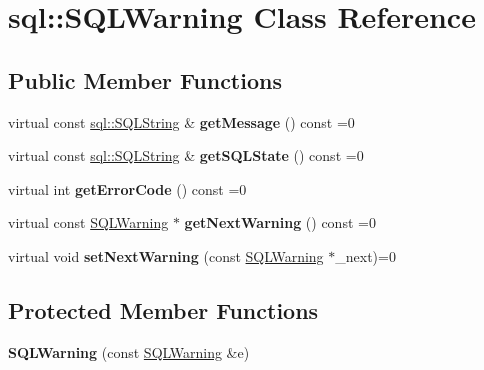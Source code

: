 \hypertarget{classsql_1_1_s_q_l_warning}{}\section{sql\+:\+:S\+Q\+L\+Warning Class Reference}
\label{classsql_1_1_s_q_l_warning}
\subsection*{Public Member Functions}
\begin{DoxyCompactItemize}
\item 
\hypertarget{classsql_1_1_s_q_l_warning_a660df3d9cd98a5ac7bc8bc9edf7cc8b1}{}\label{classsql_1_1_s_q_l_warning_a660df3d9cd98a5ac7bc8bc9edf7cc8b1} 
virtual const \hyperlink{classsql_1_1_s_q_l_string}{sql\+::\+S\+Q\+L\+String} \& {\bfseries get\+Message} () const =0
\item 
\hypertarget{classsql_1_1_s_q_l_warning_a47e6991427a672be4cbc0e32295aea28}{}\label{classsql_1_1_s_q_l_warning_a47e6991427a672be4cbc0e32295aea28} 
virtual const \hyperlink{classsql_1_1_s_q_l_string}{sql\+::\+S\+Q\+L\+String} \& {\bfseries get\+S\+Q\+L\+State} () const =0
\item 
\hypertarget{classsql_1_1_s_q_l_warning_a6c840336844c022bc1fd8ab8158da4ea}{}\label{classsql_1_1_s_q_l_warning_a6c840336844c022bc1fd8ab8158da4ea} 
virtual int {\bfseries get\+Error\+Code} () const =0
\item 
\hypertarget{classsql_1_1_s_q_l_warning_a37d3ffe0295388c82ca9cb8ed1d7e0d4}{}\label{classsql_1_1_s_q_l_warning_a37d3ffe0295388c82ca9cb8ed1d7e0d4} 
virtual const \hyperlink{classsql_1_1_s_q_l_warning}{S\+Q\+L\+Warning} $\ast$ {\bfseries get\+Next\+Warning} () const =0
\item 
\hypertarget{classsql_1_1_s_q_l_warning_acf0c7092bf4ef8cd4885471f20de76e0}{}\label{classsql_1_1_s_q_l_warning_acf0c7092bf4ef8cd4885471f20de76e0} 
virtual void {\bfseries set\+Next\+Warning} (const \hyperlink{classsql_1_1_s_q_l_warning}{S\+Q\+L\+Warning} $\ast$\+\_\+next)=0
\end{DoxyCompactItemize}
\subsection*{Protected Member Functions}
\begin{DoxyCompactItemize}
\item 
\hypertarget{classsql_1_1_s_q_l_warning_aead494b8feb63db50bb94cf7fac4f208}{}\label{classsql_1_1_s_q_l_warning_aead494b8feb63db50bb94cf7fac4f208} 
{\bfseries S\+Q\+L\+Warning} (const \hyperlink{classsql_1_1_s_q_l_warning}{S\+Q\+L\+Warning} \&e)
\end{DoxyCompactItemize}
